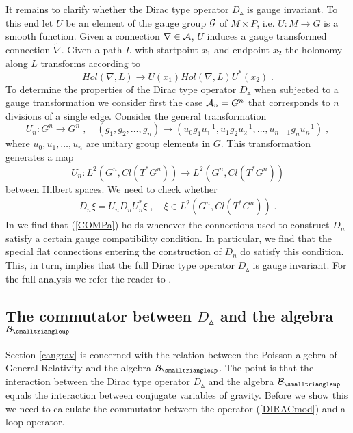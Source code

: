 \documentclass[12pt]{article}
\newcommand{\ba}{\begin{eqnarray}}
\newcommand{\ea}{\end{eqnarray}}
\def\ca{{\cal A}}
\def\cb{{\cal B}}
\def\cg{{\cal G}}
\begin{document}
It remains to clarify whether the Dirac type operator $D_{\smalltriangleup}$ is gauge invariant. To this end
let $U$ be an element of the gauge group $\cg$ of $M\times P$, i.e. $U:M\rightarrow G$ is a smooth function. Given a connection $\nabla\in\ca$, $U$ induces a gauge transformed connection $\tilde{\nabla}$. Given a path $L$ with startpoint $x_1$ and endpoint $x_2$ the holonomy along $L$ transforms according to
\[
Hol(\nabla,L)\rightarrow U(x_1)Hol(\nabla,L)U^\ast(x_2)\;.
\]
To determine the properties of the Dirac type operator $D_\smalltriangleup$ when subjected to a gauge transformation we consider first the case $\ca_n=G^n$ that corresponds to $n$ divisions of a single edge. Consider the general transformation
\[
U_n: G^n\rightarrow G^n\;,\quad (g_1,g_2,\ldots,g_n)\rightarrow (u_0 g_1 u_1^{-1},u_1 g_2 u_2^{-1},\ldots,u_{n-1} g_n u_{n}^{-1} )\;,
\]
where $u_0,u_1,\ldots,u_n$ are unitary group elements in $G$. This transformation generates a map
\[
U_n:L^2(G^n,Cl(T^\ast G^n))\rightarrow L^2(G^n,Cl(T^\ast G^n))
\]
between Hilbert spaces. We need to check whether 
\ba 
D_n\xi = U_n D_n U_n^\ast \xi\;,\quad \xi\in L^2(G^n,Cl(T^\ast G^n))\;.
\label{COMPa}
\ea
In \cite{Aastrup} we find that (\ref{COMPa}) holds whenever the connections used to construct $D_n$ satisfy a certain gauge compatibility condition. In particular, we find that the special flat connections entering the construction of $D_n$ do satisfy this condition. This, in turn, implies that the full Dirac type operator $D_{\smalltriangleup}$ is gauge invariant. For the full analysis we refer the reader to \cite{Aastrup}.












\subsection{The commutator between $D_{\smalltriangleup}$ and the algebra $\cb_{\smalltriangleup}$}
\label{commutatorsection}



Section \ref{cangrav} is concerned with the relation between the Poisson algebra of General Relativity and the algebra $\cb_{\smalltriangleup}$. The point is that the interaction between the Dirac type operator $D_{\smalltriangleup}$ and the algebra $\cb_{\smalltriangleup}$ equals the interaction between conjugate variables of gravity. Before we show this we need to calculate the commutator between the operator (\ref{DIRACmod}) and a loop operator. 
\end{document}
